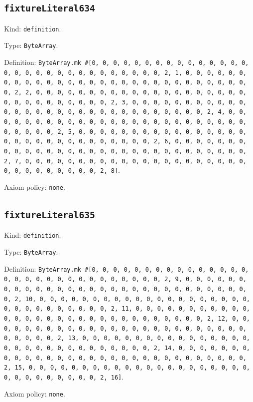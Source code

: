 \documentclass[11pt]{article}
\begin{document}
\subsection*{\texttt{fixtureLiteral634}}
\noindent Kind: \texttt{definition}.\par
\noindent Type: \texttt{ByteArray}.\par
\noindent Definition: \texttt{ByteArray.mk \#[0, 0, 0, 0, 0, 0, 0, 0, 0, 0, 0, 0, 0, 0, 0, 0, 0, 0, 0, 0, 0, 0, 0, 0, 0, 0, 0, 0, 0, 0, 2, 1, 0, 0, 0, 0, 0, 0, 0, 0, 0, 0, 0, 0, 0, 0, 0, 0, 0, 0, 0, 0, 0, 0, 0, 0, 0, 0, 0, 0, 0, 0, 2, 2, 0, 0, 0, 0, 0, 0, 0, 0, 0, 0, 0, 0, 0, 0, 0, 0, 0, 0, 0, 0, 0, 0, 0, 0, 0, 0, 0, 0, 0, 0, 2, 3, 0, 0, 0, 0, 0, 0, 0, 0, 0, 0, 0, 0, 0, 0, 0, 0, 0, 0, 0, 0, 0, 0, 0, 0, 0, 0, 0, 0, 0, 0, 2, 4, 0, 0, 0, 0, 0, 0, 0, 0, 0, 0, 0, 0, 0, 0, 0, 0, 0, 0, 0, 0, 0, 0, 0, 0, 0, 0, 0, 0, 0, 0, 2, 5, 0, 0, 0, 0, 0, 0, 0, 0, 0, 0, 0, 0, 0, 0, 0, 0, 0, 0, 0, 0, 0, 0, 0, 0, 0, 0, 0, 0, 0, 0, 2, 6, 0, 0, 0, 0, 0, 0, 0, 0, 0, 0, 0, 0, 0, 0, 0, 0, 0, 0, 0, 0, 0, 0, 0, 0, 0, 0, 0, 0, 0, 0, 2, 7, 0, 0, 0, 0, 0, 0, 0, 0, 0, 0, 0, 0, 0, 0, 0, 0, 0, 0, 0, 0, 0, 0, 0, 0, 0, 0, 0, 0, 0, 0, 2, 8]}.\par
\noindent Axiom policy: \texttt{none}.\par
\subsection*{\texttt{fixtureLiteral635}}
\noindent Kind: \texttt{definition}.\par
\noindent Type: \texttt{ByteArray}.\par
\noindent Definition: \texttt{ByteArray.mk \#[0, 0, 0, 0, 0, 0, 0, 0, 0, 0, 0, 0, 0, 0, 0, 0, 0, 0, 0, 0, 0, 0, 0, 0, 0, 0, 0, 0, 0, 0, 2, 9, 0, 0, 0, 0, 0, 0, 0, 0, 0, 0, 0, 0, 0, 0, 0, 0, 0, 0, 0, 0, 0, 0, 0, 0, 0, 0, 0, 0, 0, 0, 2, 10, 0, 0, 0, 0, 0, 0, 0, 0, 0, 0, 0, 0, 0, 0, 0, 0, 0, 0, 0, 0, 0, 0, 0, 0, 0, 0, 0, 0, 0, 0, 2, 11, 0, 0, 0, 0, 0, 0, 0, 0, 0, 0, 0, 0, 0, 0, 0, 0, 0, 0, 0, 0, 0, 0, 0, 0, 0, 0, 0, 0, 0, 0, 2, 12, 0, 0, 0, 0, 0, 0, 0, 0, 0, 0, 0, 0, 0, 0, 0, 0, 0, 0, 0, 0, 0, 0, 0, 0, 0, 0, 0, 0, 0, 0, 2, 13, 0, 0, 0, 0, 0, 0, 0, 0, 0, 0, 0, 0, 0, 0, 0, 0, 0, 0, 0, 0, 0, 0, 0, 0, 0, 0, 0, 0, 0, 0, 2, 14, 0, 0, 0, 0, 0, 0, 0, 0, 0, 0, 0, 0, 0, 0, 0, 0, 0, 0, 0, 0, 0, 0, 0, 0, 0, 0, 0, 0, 0, 0, 2, 15, 0, 0, 0, 0, 0, 0, 0, 0, 0, 0, 0, 0, 0, 0, 0, 0, 0, 0, 0, 0, 0, 0, 0, 0, 0, 0, 0, 0, 0, 0, 2, 16]}.\par
\noindent Axiom policy: \texttt{none}.\par
\end{document}
